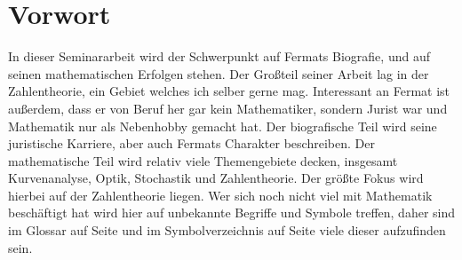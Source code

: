 \section{Vorwort}

In dieser Seminararbeit wird der Schwerpunkt auf Fermats Biografie, und auf seinen mathematischen Erfolgen stehen. Der Großteil seiner Arbeit lag in der Zahlentheorie, ein Gebiet welches ich selber gerne mag. Interessant an Fermat ist außerdem, dass er von Beruf her gar kein Mathematiker, sondern Jurist war und Mathematik nur als Nebenhobby gemacht hat. Der biografische Teil wird seine juristische Karriere, aber auch Fermats Charakter beschreiben. Der mathematische Teil wird relativ viele Themengebiete decken, insgesamt Kurvenanalyse, Optik, Stochastik und Zahlentheorie. Der größte Fokus wird hierbei auf der Zahlentheorie liegen. Wer sich noch nicht viel mit Mathematik beschäftigt hat wird hier auf unbekannte Begriffe und Symbole treffen, daher sind im Glossar auf Seite \pageref{sec:glossary} und im Symbolverzeichnis auf Seite \pageref{sec:symb} viele dieser aufzufinden sein.
